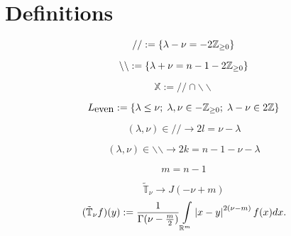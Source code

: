 \documentclass[12pt]{article} %
\newcommand{\Le}{L_{\mbox{even}}}
\begin{document}
\section{Definitions}
\begin{center}\begin{equation*} //:=\left\{\lambda-\nu=-2\mathbb{Z}_{\geq0}\right\} \end{equation*}\end{center}
\begin{center}\begin{equation*} \backslash\backslash:=\left\{\lambda+\nu=n-1-2\mathbb{Z}_{\geq0}\right\} \end{equation*}\end{center}
\begin{center}\begin{equation*} \mathbb{X}:=//\cap\backslash\backslash \end{equation*}\end{center}
\begin{center}\begin{equation*}\Le:=\mycbra{\lambda\leq\nu;\;\lambda,\nu\in-\Z_{\geq0};\;\lambda-\nu\in2\Z}\end{equation*}\end{center}
\begin{center}\begin{equation*}(\lambda,\nu)\in//\longrightarrow 2l=\nu-\lambda\end{equation*}\end{center}
\begin{center}\begin{equation*}(\lambda,\nu)\in\backslash\backslash\longrightarrow 2k=n-1-\nu-\lambda\end{equation*}\end{center}
\begin{center}\begin{equation*} m=n-1\end{equation*}\end{center}
$$\tilde{\mathbb{T}}_\nu\to J(-\nu+m)$$
$$(\tilde{\mathbb{T}}_\nu f)(y):=\frac{1}{\Gamma(\nu-\frac{m}{2})}\int_{\R^m}\myabs{x-y}^{2(\nu-m)}f(x)dx.$$
\end{document}
